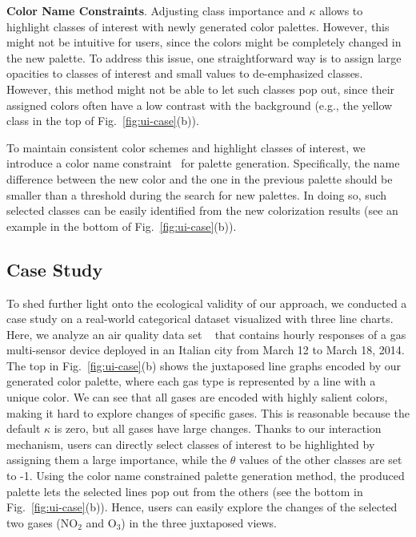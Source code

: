 \vspace{1.5mm}
\noindent\textbf{Color Name Constraints}.
Adjusting class importance and $\kappa$  allows to highlight  classes of interest with newly generated color palettes. However, this might not be intuitive for users, since the colors might be completely changed in the new palette. To address this issue,
one straightforward way is to  assign large opacities  to classes of interest and small values to de-emphasized classes. However, this method might not be able to let such classes pop out, since their assigned colors often have a low contrast with the background (e.g., the yellow class in the top of Fig.~\ref{fig:ui-case}(b)).

To maintain consistent color schemes and highlight classes of interest, we introduce a color name constraint~\cite{heer2012color} for palette generation. Specifically, the name difference between the new color and the one in the previous palette should be smaller than a threshold during the search for new palettes.
In doing so, such selected classes can be easily identified from the new colorization results (see an example in the bottom of Fig.~\ref{fig:ui-case}(b)).

\subsection{Case Study}
\label{sec:caseStudy}



To shed further light onto the ecological validity of our approach, we conducted a case study on a real-world categorical dataset visualized with three line charts.
Here, we analyze an air quality data set ~\cite{DEVITO2008750} that contains hourly responses of a gas multi-sensor device deployed in an Italian city from March 12 to March 18, 2014.
The top in Fig.~\ref{fig:ui-case}(b) shows the juxtaposed line graphs encoded by our generated color palette, where each gas type is represented by a line with a unique color.
We can see that all gases are encoded with highly salient colors, making it hard to explore changes of specific gases. This is reasonable because the default $\kappa$ is zero, but all gases have large changes.
Thanks to our interaction mechanism, users can directly select classes of interest to be highlighted by assigning them a large importance, while  the $\theta$ values of the other classes are set to -1. Using the color name constrained palette generation method, the produced palette lets the selected lines pop out from the others (see the bottom in Fig.~\ref{fig:ui-case}(b)). Hence, users can easily explore the changes of the selected two gases (NO$_2$ and O$_3$) in the three juxtaposed views.


